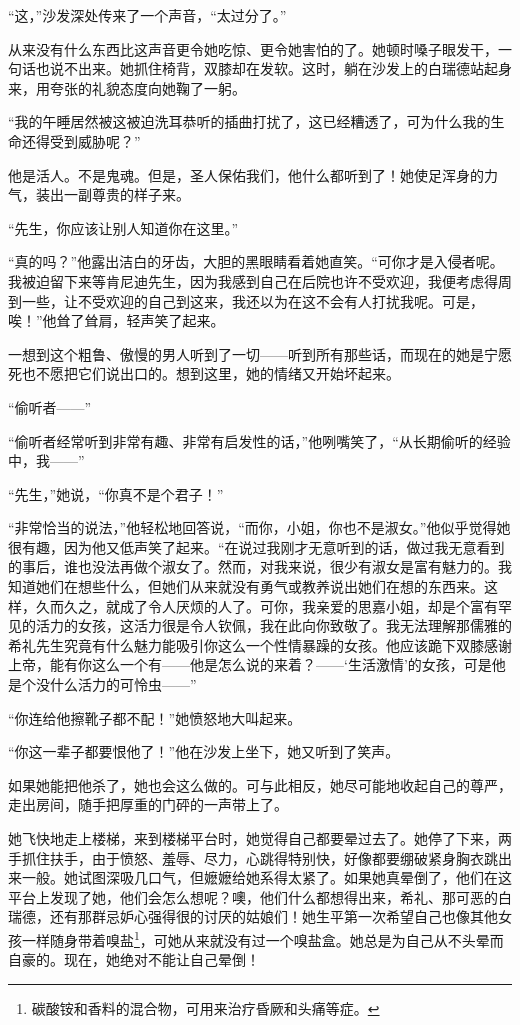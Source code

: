 \par “这，”沙发深处传来了一个声音，“太过分了。”
\par 从来没有什么东西比这声音更令她吃惊、更令她害怕的了。她顿时嗓子眼发干，一句话也说不出来。她抓住椅背，双膝却在发软。这时，躺在沙发上的白瑞德站起身来，用夸张的礼貌态度向她鞠了一躬。
\par “我的午睡居然被这被迫洗耳恭听的插曲打扰了，这已经糟透了，可为什么我的生命还得受到威胁呢？”
\par 他是活人。不是鬼魂。但是，圣人保佑我们，他什么都听到了！她使足浑身的力气，装出一副尊贵的样子来。
\par “先生，你应该让别人知道你在这里。”
\par “真的吗？”他露出洁白的牙齿，大胆的黑眼睛看着她直笑。“可你才是入侵者呢。我被迫留下来等肯尼迪先生，因为我感到自己在后院也许不受欢迎，我便考虑得周到一些，让不受欢迎的自己到这来，我还以为在这不会有人打扰我呢。可是，唉！”他耸了耸肩，轻声笑了起来。
\par 一想到这个粗鲁、傲慢的男人听到了一切——听到所有那些话，而现在的她是宁愿死也不愿把它们说出口的。想到这里，她的情绪又开始坏起来。
\par “偷听者——”
\par “偷听者经常听到非常有趣、非常有启发性的话，”他咧嘴笑了，“从长期偷听的经验中，我——”
\par “先生，”她说，“你真不是个君子！”
\par “非常恰当的说法，”他轻松地回答说，“而你，小姐，你也不是淑女。”他似乎觉得她很有趣，因为他又低声笑了起来。“在说过我刚才无意听到的话，做过我无意看到的事后，谁也没法再做个淑女了。然而，对我来说，很少有淑女是富有魅力的。我知道她们在想些什么，但她们从来就没有勇气或教养说出她们在想的东西来。这样，久而久之，就成了令人厌烦的人了。可你，我亲爱的思嘉小姐，却是个富有罕见的活力的女孩，这活力很是令人钦佩，我在此向你致敬了。我无法理解那儒雅的希礼先生究竟有什么魅力能吸引你这么一个性情暴躁的女孩。他应该跪下双膝感谢上帝，能有你这么一个有——他是怎么说的来着？——‘生活激情’的女孩，可是他是个没什么活力的可怜虫——”
\par “你连给他擦靴子都不配！”她愤怒地大叫起来。
\par “你这一辈子都要恨他了！”他在沙发上坐下，她又听到了笑声。
\par 如果她能把他杀了，她也会这么做的。可与此相反，她尽可能地收起自己的尊严，走出房间，随手把厚重的门砰的一声带上了。
\par  
\par 她飞快地走上楼梯，来到楼梯平台时，她觉得自己都要晕过去了。她停了下来，两手抓住扶手，由于愤怒、羞辱、尽力，心跳得特别快，好像都要绷破紧身胸衣跳出来一般。她试图深吸几口气，但嬷嬷给她系得太紧了。如果她真晕倒了，他们在这平台上发现了她，他们会怎么想呢？噢，他们什么都想得出来，希礼、那可恶的白瑞德，还有那群忌妒心强得很的讨厌的姑娘们！她生平第一次希望自己也像其他女孩一样随身带着嗅盐\footnote{碳酸铵和香料的混合物，可用来治疗昏厥和头痛等症。}，可她从来就没有过一个嗅盐盒。她总是为自己从不头晕而自豪的。现在，她绝对不能让自己晕倒！

